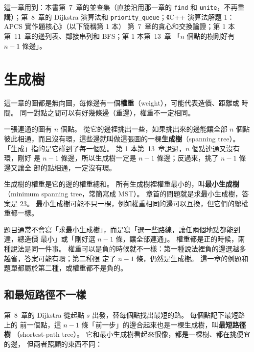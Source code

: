 這一章用到：本書第~7~章的並查集（直接沿用那一章的 \texttt{find} 和
\texttt{unite}，不再重講）；第~8~章的 Dijkstra 演算法和
\texttt{priority\_queue}；《C++ 演算法解題 1：APCS 實作題核心》（以下簡稱第 1 本）
第~7~章的貪心和交換論證；第 1 本第~11~章的邊列表、鄰接串列和 BFS；第 1 本第~13~章
「$n$ 個點的樹剛好有 $n - 1$ 條邊」。

\section{生成樹}
\label{sec:mst-tree}

這一章的圖都是無向圖，每條邊有一個\textbf{權重}（weight），可能代表造價、距離或
時間。 同一對點之間可以有好幾條邊（重邊），權重不一定相同。

一張連通的圖有 $n$ 個點。 從它的邊裡挑出一些，如果挑出來的邊能讓全部 $n$ 個點
彼此相通，而且沒有環，這些邊就叫做這張圖的一棵\textbf{生成樹}（spanning tree）。
「生成」指的是它碰到了每一個點。 第 1 本第~13~章說過，$n$ 個點連通又沒有環，剛好
是 $n - 1$ 條邊，所以生成樹一定是 $n - 1$ 條邊；反過來，挑了 $n - 1$ 條邊又讓全
部的點相通，一定沒有環。

生成樹的權重是它的邊的權重總和。 所有生成樹裡權重最小的，叫\textbf{最小生成樹}
（minimum spanning tree，常簡寫成 MST）。 章首的問題就是求最小生成樹，答案是
$23$。 最小生成樹可能不只一棵，例如權重相同的邊可以互換，但它們的總權重都一樣。

題目通常不會寫「求最小生成樹」，而是寫「選一些路線，讓任兩個地點都能到達，總造價
最小」或「剛好選 $n - 1$ 條，讓全部連通」。 權重都是正的時候，兩種說法是同一件事。
權重可以是負的時候就不一樣：第一種說法裡負的邊選越多越省，答案可能有環；第二種限
定了 $n - 1$ 條，仍然是生成樹。 這一章的例題和題單都屬於第二種，或權重都不是負的。

\subsection{和最短路徑不一樣}
\label{sec:mst-vs-sp}

第~8~章的 Dijkstra 從起點 $s$ 出發，替每個點找出最短的路。 每個點記下最短路上的
前一個點，這 $n - 1$ 條「前一步」的邊合起來也是一棵生成樹，叫\textbf{最短路徑樹}
（shortest-path tree）。 它和最小生成樹看起來很像，都是一棵樹、都在挑便宜的邊，
但兩者照顧的東西不同：

